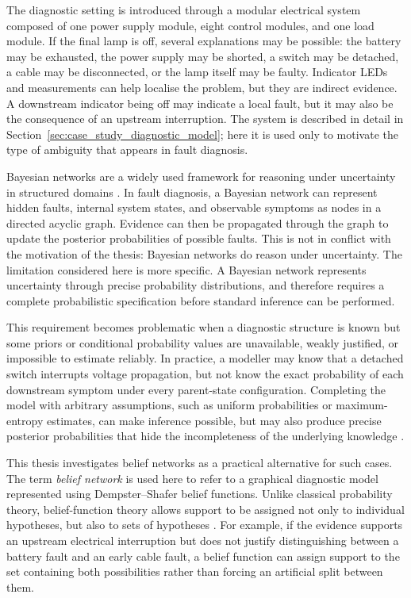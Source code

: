 \documentclass[runningheads]{llncs}
\begin{document}
The diagnostic setting is introduced through a modular electrical system composed of one power supply module, eight control modules, and one load module. If the final lamp is off, several explanations may be possible: the battery may be exhausted, the power supply may be shorted, a switch may be detached, a cable may be disconnected, or the lamp itself may be faulty. Indicator LEDs and measurements can help localise the problem, but they are indirect evidence. A downstream indicator being off may indicate a local fault, but it may also be the consequence of an upstream interruption. The system is described in detail in Section~\ref{sec:case_study_diagnostic_model}; here it is used only to motivate the type of ambiguity that appears in fault diagnosis.

Bayesian networks are a widely used framework for reasoning under uncertainty in structured domains \cite{Pearl1988,Heckerman1995}. In fault diagnosis, a Bayesian network can represent hidden faults, internal system states, and observable symptoms as nodes in a directed acyclic graph. Evidence can then be propagated through the graph to update the posterior probabilities of possible faults. This is not in conflict with the motivation of the thesis: Bayesian networks do reason under uncertainty. The limitation considered here is more specific. A Bayesian network represents uncertainty through precise probability distributions, and therefore requires a complete probabilistic specification before standard inference can be performed.

This requirement becomes problematic when a diagnostic structure is known but some priors or conditional probability values are unavailable, weakly justified, or impossible to estimate reliably. In practice, a modeller may know that a detached switch interrupts voltage propagation, but not know the exact probability of each downstream symptom under every parent-state configuration. Completing the model with arbitrary assumptions, such as uniform probabilities or maximum-entropy estimates, can make inference possible, but may also produce precise posterior probabilities that hide the incompleteness of the underlying knowledge \cite{Shenoy2023IncompleteBN}.

This thesis investigates belief networks as a practical alternative for such cases. The term \emph{belief network} is used here to refer to a graphical diagnostic model represented using Dempster--Shafer belief functions. Unlike classical probability theory, belief-function theory allows support to be assigned not only to individual hypotheses, but also to sets of hypotheses \cite{Dempster1967,Shafer1976}. For example, if the evidence supports an upstream electrical interruption but does not justify distinguishing between a battery fault and an early cable fault, a belief function can assign support to the set containing both possibilities rather than forcing an artificial split between them.
\end{document}
